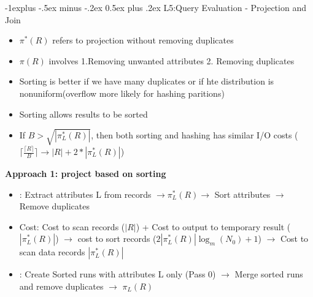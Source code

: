 \documentclass[10pt, landscape]{article}
\makeatletter
\renewcommand{\subsection}{\@startsection{subsection}{2}{0mm}%
                                {-1explus -.5ex minus -.2ex}%
                                {0.5ex plus .2ex}%
                                {\normalfont\normalsize\bfseries}}
\newcommand{\ceil}[1]{\lceil #1 \rceil}
\makeatother
\begin{document}
\begin{multicols}{4}
\subsection{L5:Query Evaluation - Projection and Join}
\begin{itemize}
  \item $\pi^*(R)$ refers to projection without removing duplicates
  \item $\pi(R)$ involves 1.Removing unwanted attributes 2. Removing duplicates
  \item Sorting is better if we have many duplicates or if hte distribution is nonuniform(overflow more likely for hashing paritions)
  \item Sorting allows results to be sorted
  \item If $B > \sqrt{|\pi^*_L(R)|}$, then both sorting and hashing has similar I/O costs ($\ceil{\frac{\ceil{R}}{B}} \rightarrow |R| + 2*|\pi^*_L(R)|$)
\end{itemize} 

\textbf{Approach 1: project based on sorting}\\
\begin{itemize}
  \item \textbf{\color{red}{Naive}}: Extract attributes L from records $\rightarrow\pi^*_L(R) \rightarrow$ Sort attributes $\rightarrow$ Remove duplicates
  \item Cost: Cost to scan records ($|R|$) + Cost to output to temporary result ($|\pi^*_L(R)|$) $\rightarrow$ cost to sort records ($2|\pi^*_L(R)|\log_m(N_0)+1$) $\rightarrow$ Cost to scan data records $|\pi^*_L(R)|$
  \item \textbf{\color{green}{Optimisation}}: Create Sorted runs with attributes L only (Pass 0) $\rightarrow$ Merge sorted runs and remove duplicates $\rightarrow$ $\pi_L(R)$ 
\end{itemize}


\end{multicols}
\end{document}
